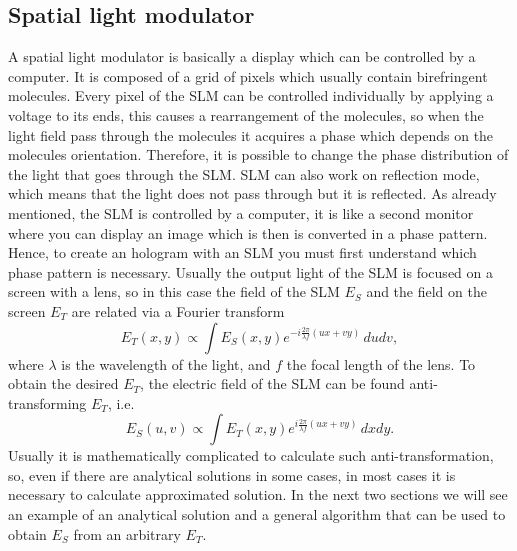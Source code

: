 \documentclass[a4paper,10pt]{article}
\begin{document}
\subsection{Spatial light modulator}
A spatial light modulator is basically a display which can be controlled by a computer. It is composed of a grid of pixels which usually contain birefringent molecules. Every pixel of the SLM can be controlled individually by applying a voltage to its ends, this causes a rearrangement of the molecules, so when the light field pass through the molecules it acquires a phase which depends on the molecules orientation. Therefore, it is possible to change the phase distribution of the light that goes through the SLM. SLM can also work on reflection mode, which means that the light does not pass through but it is reflected. As already mentioned, the SLM is controlled by a computer, it is like a second monitor where you can display an image which is then is converted in a phase pattern. Hence, to create an hologram with an SLM you must first understand which phase pattern is necessary. Usually the output light of the SLM is focused on a screen with a lens, so in this case the field of the SLM $E_S$ and the field on the screen $E_T$ are related via a Fourier transform 
\begin{equation}E_T(x,y) \propto \int E_S(x,y)e^{-i\frac{2\pi}{\lambda f}(ux+vy)}\,dudv,\end{equation}
where $\lambda$ is the wavelength of the light, and $f$ the focal length of the lens. To obtain the desired $E_T$, the electric field of the SLM can be found anti-transforming $E_T$, i.e.
\begin{equation}\label{slmdistribution}
E_S(u,v) \propto \int E_T(x,y)e^{i\frac{2\pi}{\lambda f}(ux+vy)}\,dxdy.
\end{equation}
Usually it is mathematically complicated to calculate such anti-transformation, so, even if there are analytical solutions in some cases, in most cases it is necessary to calculate approximated solution. In the next two sections we will see an example of an analytical solution and a general algorithm that can be used to obtain $E_S$ from an arbitrary $E_T$.
\end{document}
